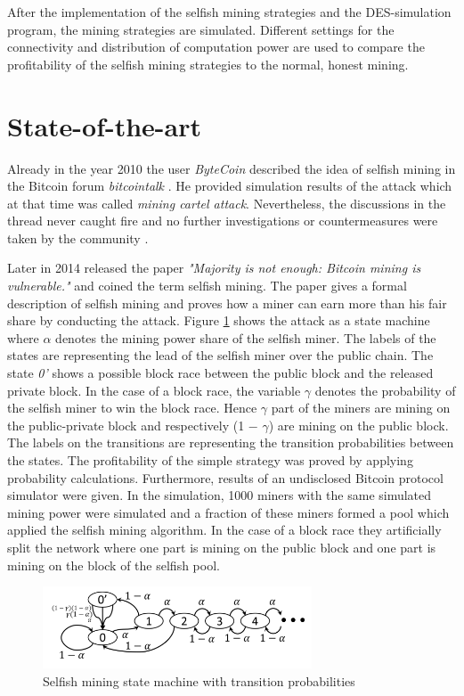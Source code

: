 \documentclass{scrartcl}
\begin{document}
After the implementation of the selfish mining strategies and the DES-simulation program, the mining strategies are simulated. Different settings for the connectivity and distribution of computation power are used to compare the profitability of the selfish mining strategies to the normal, honest mining.

\section{State-of-the-art}
Already in the year 2010 the user \textit{ByteCoin} described the idea of selfish mining in the Bitcoin forum \textit{bitcointalk} \cite{ByteCoin2010}. He provided simulation results of the attack which at that time was called \textit{mining cartel attack}. Nevertheless, the discussions in the thread never caught fire and no further investigations or countermeasures were taken by the community \citep{BitcoinTalk2010, bahack2013theoretical}.

Later in 2014 \citeauthor{eyal2014majority} released the paper \textit{"Majority is not enough: Bitcoin mining is vulnerable."} and coined the term selfish mining. The paper gives a formal description of selfish mining and proves how a miner can earn more than his fair share by conducting the attack. Figure \ref{fig:selfish_mining} shows the attack as a state machine where $\alpha$ denotes the mining power share of the selfish miner. The labels of the states are representing the lead of the selfish miner over the public chain. The state \textit{0'} shows a possible block race between the public block and the released private block. In the case of a block race, the variable $\gamma$ denotes the probability of the selfish miner to win the block race. Hence $\gamma$ part of the miners are mining on the public-private block and respectively (1 − $\gamma$) are mining on the public block. The labels on the transitions are representing the transition probabilities between the states. The profitability of the simple strategy was proved by applying probability calculations. Furthermore, results of an undisclosed Bitcoin protocol simulator were given. In the simulation, 1000 miners with the same simulated mining power were simulated and a fraction of these miners formed a pool which applied the selfish mining algorithm. In the case of a block race they artificially split the network where one part is mining on the public block and one part is mining on the block of the selfish pool.


\begin{figure}[t]
\includegraphics[width=8cm]{figures/selfish_mining}
\centering
\caption{Selfish mining state machine with transition probabilities \cite{eyal2014majority}}
\label{fig:selfish_mining}
\end{figure}
\end{document}
